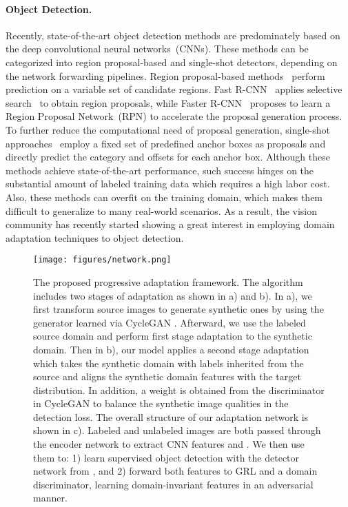 \documentclass[10pt,twocolumn,letterpaper]{article}
\begin{document}
\paragraph{Object Detection.}
Recently, state-of-the-art object detection methods are predominately based on the deep convolutional neural networks~(CNNs).
These methods can be categorized into region proposal-based and single-shot detectors, depending on the network forwarding pipelines.
Region proposal-based methods~\cite{girshick2015fast, Ren_2017} perform prediction on a variable set of candidate regions.
Fast R-CNN~\cite{girshick2015fast} applies selective search~\cite{uijlings2013selective} to obtain region proposals, while Faster R-CNN~\cite{Ren_2017} proposes to learn a Region Proposal Network~(RPN) to accelerate the proposal generation process.
To further reduce the computational need of proposal generation, single-shot approaches~\cite{Redmon_2016, Redmon_2017, Redmon2018YOLOv3AI, liu2016ssd} employ a fixed set of predefined anchor boxes as proposals and directly predict the category and offsets for each anchor box.
Although these methods achieve state-of-the-art performance, such success hinges on the substantial amount of labeled training data which requires a high labor cost.
Also, these methods can overfit on the training domain, which makes them difficult to generalize to many real-world scenarios.
As a result, the vision community has recently started showing a great interest in employing domain adaptation techniques to object detection.

\begin{figure*}
		\begin{center}
        \texttt{[image: figures/network.png]}
		\end{center}
		\caption{
        The proposed progressive adaptation framework.
The algorithm includes two stages of adaptation as shown in a) and b).
In a), we first transform source images to generate synthetic ones by using the generator  learned via CycleGAN \cite{CycleGAN2017}.
Afterward, we use the labeled source domain and perform first stage adaptation to the synthetic domain.
Then in b), our model applies a second stage adaptation which takes the synthetic domain with labels inherited from the source and aligns the synthetic domain features with the target distribution.
In addition, a weight  is obtained from the discriminator  in CycleGAN to balance the synthetic image qualities in the detection loss.
The overall structure of our adaptation network is shown in c).
Labeled and unlabeled images are both passed through the encoder network  to extract CNN features  and . 
We then use them to: 1) learn supervised object detection with the detector network from , and 2) forward both features to GRL and a domain discriminator, learning domain-invariant features in an adversarial manner.
		}
		\label{fig:da_net}
\end{figure*}
\end{document}
